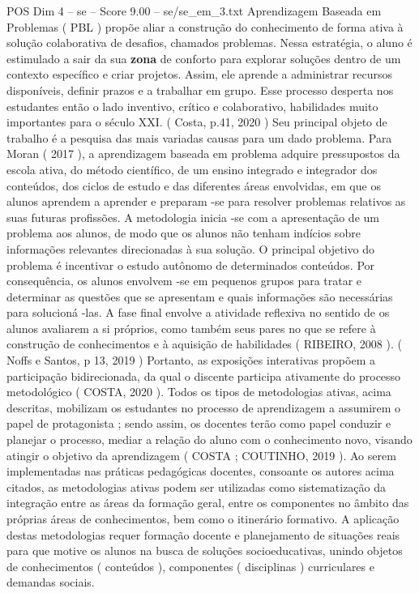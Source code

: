 \begin{textsample}{POS Dim 4 – se – Score 9.00 – se/se\_em\_3.txt}
Aprendizagem Baseada em Problemas ( PBL ) propõe aliar a construção do conhecimento de forma ativa à solução colaborativa de desafios, chamados problemas.
Nessa estratégia, o aluno é estimulado a sair da sua \textbf{zona} de conforto para explorar soluções dentro de um contexto específico e criar projetos.
Assim, ele aprende a administrar recursos disponíveis, definir prazos e a trabalhar em grupo.
Esse processo desperta nos estudantes então o lado inventivo, crítico e colaborativo, habilidades muito importantes para o século XXI. ( Costa, p.41, 2020 ) Seu principal objeto de trabalho é a pesquisa das mais variadas causas para um dado problema.
Para Moran ( 2017 ), a aprendizagem baseada em problema adquire pressupostos da escola ativa, do método científico, de um ensino integrado e integrador dos conteúdos, dos ciclos de estudo e das diferentes áreas envolvidas, em que os alunos aprendem a aprender e preparam -se para resolver problemas relativos as suas futuras profissões.
A metodologia inicia -se com a apresentação de um problema aos alunos, de modo que os alunos não tenham indícios sobre informações relevantes direcionadas à sua solução.
O principal objetivo do problema é incentivar o estudo autônomo de determinados conteúdos.
Por consequência, os alunos envolvem -se em pequenos grupos para tratar e determinar as questões que se apresentam e quais informações são necessárias para solucioná -las.
A fase final envolve a atividade reflexiva no sentido de os alunos avaliarem a si próprios, como também seus pares no que se refere à construção de conhecimentos e à aquisição de habilidades ( RIBEIRO, 2008 ). ( Noffs e Santos, p 13, 2019 ) Portanto, as exposições interativas propõem a participação bidirecionada, da qual o discente participa ativamente do processo metodológico ( COSTA, 2020 ).
Todos os tipos de metodologias ativas, acima descritas, mobilizam os estudantes no processo de aprendizagem a assumirem o papel de protagonista ; sendo assim, os docentes terão como papel conduzir e planejar o processo, mediar a relação do aluno com o conhecimento novo, visando atingir o objetivo da aprendizagem ( COSTA ; COUTINHO, 2019 ).
Ao serem implementadas nas práticas pedagógicas docentes, consoante os autores acima citados, as metodologias ativas podem ser utilizadas como sistematização da integração entre as áreas da formação geral, entre os componentes no âmbito das próprias áreas de conhecimentos, bem como o itinerário formativo.
A aplicação destas metodologias requer formação docente e planejamento de situações reais para que motive os alunos na busca de soluções socioeducativas, unindo objetos de conhecimentos ( conteúdos ), componentes ( disciplinas ) curriculares e demandas sociais.

\end{textsample}
